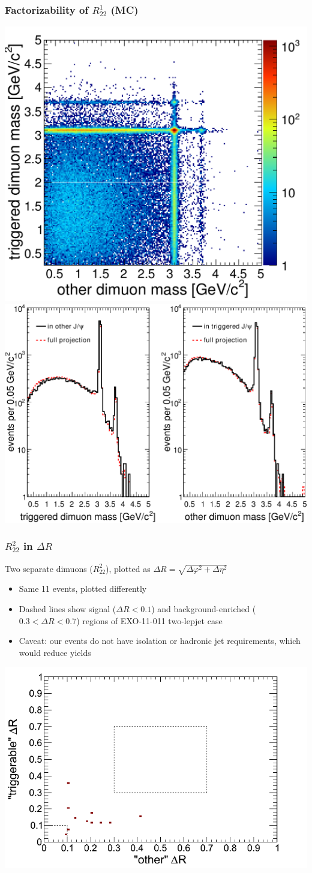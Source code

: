 \documentclass[compress]{beamer}
\begin{document}
\begin{frame}
\frametitle{Factorizability of $R^1_{22}$ (MC)}

\includegraphics[height=4.4 cm]{mc_dimudimu_wholecontrol.pdf} \hfill
\includegraphics[height=4.2 cm]{mc_wholecontrolregions_factorize.pdf}
\end{frame}

\begin{frame}
\frametitle{$R^2_{22}$ in $\Delta R$}

Two separate dimuons ($R^2_{22}$), plotted as $\Delta R = \sqrt{\Delta \varphi^2 + \Delta \eta^2}$
\begin{itemize}
\item Same 11 events, plotted differently
\item Dashed lines show signal ($\Delta R < 0.1$) and
  background-enriched ($0.3 < \Delta R < 0.7$) regions of EXO-11-011 two-lepjet case
\item Caveat: our events do not have isolation or hadronic jet
  requirements, which would reduce yields
\end{itemize}

\begin{center}
\includegraphics[width=0.65\linewidth]{signal_background_regions_topologybased.png}
\end{center}
\end{frame}
\end{document}
